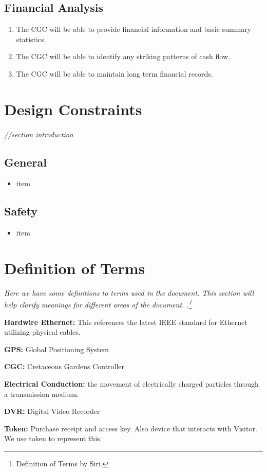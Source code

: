 \documentclass[12pt]{article}
\begin{document}
	\subsection{Financial Analysis}
	\begin{enumerate}
		\item The CGC will be able to provide financial information and basic summary statistics.
		\item The CGC will be able to identify any striking patterns of cash flow.
		\item The CGC will be able to maintain long term financial records.
	\end{enumerate}

\section{Design Constraints} %
\label{con}
\paragraph{} \textit{//section introduction}
	\subsection{General}
	\begin{itemize}
		\item item
	\end{itemize}
	
	\subsection{Safety}
	\begin{itemize}
		\item item
	\end{itemize}

\section{Definition of Terms} %
\label{def}
\textit{Here we have some definitions to terms used in the document. This section will help clarify meanings for different areas of the document. .\footnote {Definition of Terms by Siri.}}
\begin{list}{}{}
	\item \textbf{Hardwire Ethernet: }This references the latest IEEE standard for Ethernet utilizing physical cables.
	\item \textbf{GPS: }Global Positioning System 
	\item \textbf{CGC: }Cretaceous Gardens Controller 
	\item \textbf{Electrical Conduction: }the movement of electrically charged particles through a transmission medium.
	\item \textbf{DVR: }Digital Video Recorder
	\item \textbf{Token: }Purchase receipt and access key. Also device that interacts with Visitor. We use token to represent this.
\end{list}


\end{document}
